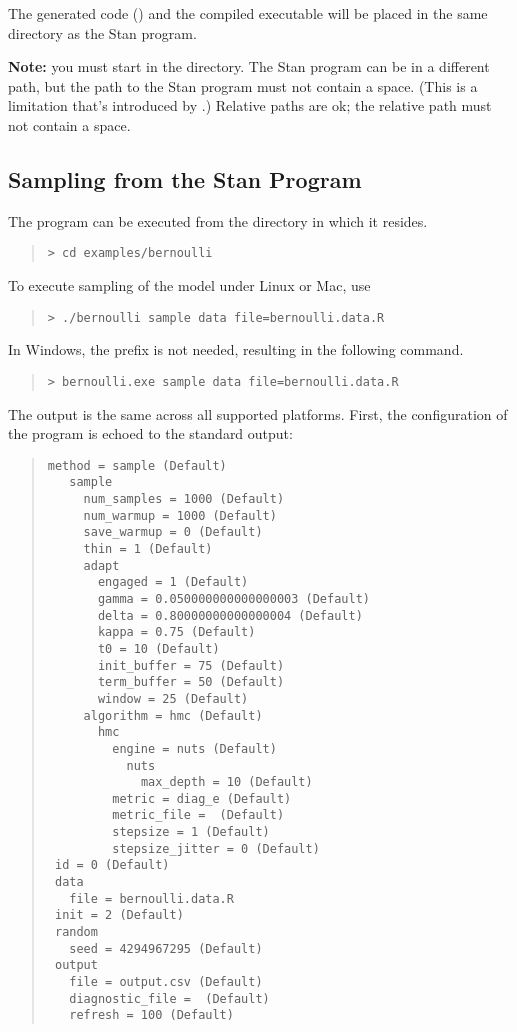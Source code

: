 The generated \Cpp code () and the compiled
executable will be placed in the same directory as the Stan program.

\textbf{Note:} you must start in the 
directory. The Stan program can be in a different path, but the path
to the Stan program must not contain a space. (This is a limitation
that's introduced by .) Relative paths are ok; the relative
path must not contain a space.

\subsection{Sampling from the Stan Program}

The program can be executed from the directory in which it resides.
%
\begin{quote}
\begin{Verbatim}[fontshape=sl]
> cd examples/bernoulli
\end{Verbatim}
\end{quote}
%
To execute sampling of the model under Linux or Mac, use
%
\begin{quote}
\begin{Verbatim}[fontshape=sl]
> ./bernoulli sample data file=bernoulli.data.R
\end{Verbatim}
\end{quote}
%
In Windows, the  prefix is not needed, resulting in the
following command.
%
\begin{quote}
\begin{Verbatim}[fontshape=sl]
> bernoulli.exe sample data file=bernoulli.data.R
\end{Verbatim}
\end{quote}
%
The output is the same across all supported platforms.  First, the
configuration of the program is echoed to the standard output:
%
\begin{quote}
\begin{Verbatim}[fontsize=\small]
 method = sample (Default)
   sample
     num_samples = 1000 (Default)
     num_warmup = 1000 (Default)
     save_warmup = 0 (Default)
     thin = 1 (Default)
     adapt
       engaged = 1 (Default)
       gamma = 0.050000000000000003 (Default)
       delta = 0.80000000000000004 (Default)
       kappa = 0.75 (Default)
       t0 = 10 (Default)
       init_buffer = 75 (Default)
       term_buffer = 50 (Default)
       window = 25 (Default)
     algorithm = hmc (Default)
       hmc
         engine = nuts (Default)
           nuts
             max_depth = 10 (Default)
         metric = diag_e (Default)
         metric_file =  (Default)
         stepsize = 1 (Default)
         stepsize_jitter = 0 (Default)
 id = 0 (Default)
 data
   file = bernoulli.data.R
 init = 2 (Default)
 random
   seed = 4294967295 (Default)
 output
   file = output.csv (Default)
   diagnostic_file =  (Default)
   refresh = 100 (Default)
\end{Verbatim}
\end{quote}
